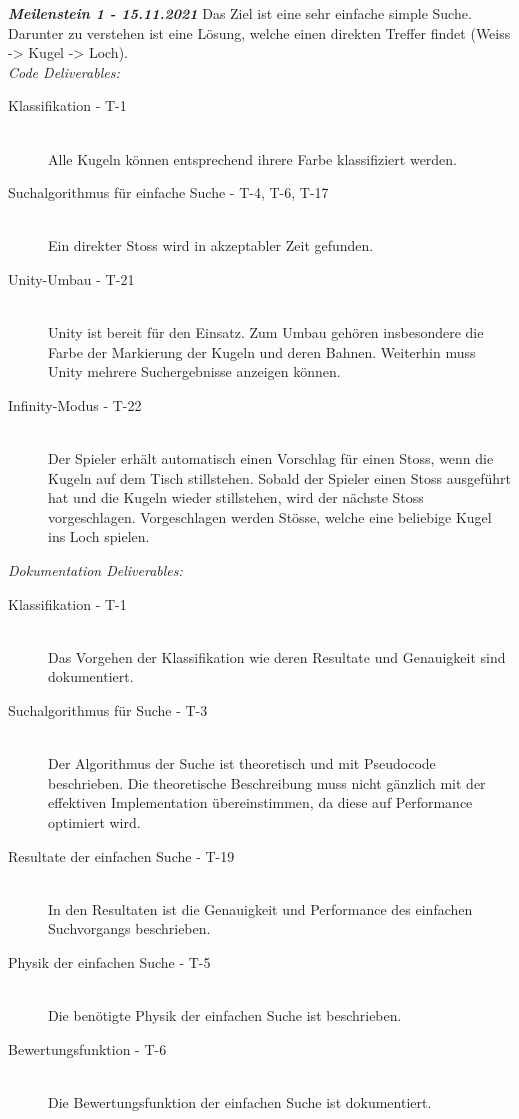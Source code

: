 \textit{\textbf{Meilenstein 1 - 15.11.2021}}
Das Ziel ist eine sehr einfache simple Suche. Darunter zu verstehen ist eine Lösung, welche einen direkten Treffer findet
(Weiss -> Kugel -> Loch).\\
\textit{Code Deliverables:}
\begin{description}
    \item[Klassifikation - T-1]\hfill \\
    Alle Kugeln können entsprechend ihrere Farbe klassifiziert werden.
    \item[Suchalgorithmus für einfache Suche - T-4, T-6, T-17]\hfill \\
    Ein direkter Stoss wird in akzeptabler Zeit gefunden.
    \item[Unity-Umbau - T-21]\hfill \\
    Unity ist bereit für den Einsatz.
    Zum Umbau gehören insbesondere die Farbe der Markierung der Kugeln und deren Bahnen.
    Weiterhin muss Unity mehrere Suchergebnisse anzeigen können.
    \item[Infinity-Modus - T-22]\hfill \\
    Der Spieler erhält automatisch einen Vorschlag für einen Stoss, wenn die Kugeln auf dem Tisch stillstehen.
    Sobald der Spieler einen Stoss ausgeführt hat und die Kugeln wieder stillstehen, wird der nächste Stoss vorgeschlagen.
    Vorgeschlagen werden Stösse, welche eine beliebige Kugel ins Loch spielen.
\end{description}
\textit{Dokumentation Deliverables:}
\begin{description}
    \item[Klassifikation - T-1]\hfill \\
    Das Vorgehen der Klassifikation wie deren Resultate und Genauigkeit sind dokumentiert.
    \item[Suchalgorithmus für Suche - T-3]\hfill \\
    Der Algorithmus der Suche ist theoretisch und mit Pseudocode beschrieben.
    Die theoretische Beschreibung muss nicht gänzlich mit der effektiven Implementation übereinstimmen, da diese auf
    Performance optimiert wird.
    \item[Resultate der einfachen Suche - T-19]\hfill \\
    In den Resultaten ist die Genauigkeit und Performance des einfachen Suchvorgangs
    beschrieben.
    \item[Physik der einfachen Suche - T-5]\hfill \\
    Die benötigte Physik der einfachen Suche ist beschrieben.
    \item[Bewertungsfunktion - T-6]\hfill \\
    Die Bewertungsfunktion der einfachen Suche ist dokumentiert.
\end{description}

